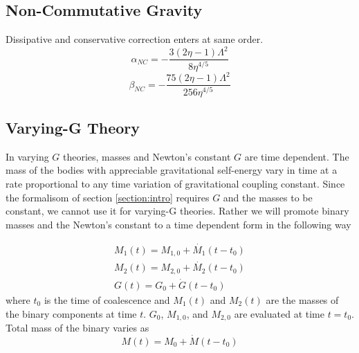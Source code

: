 \documentclass[11pt]{article}
\begin{document}
 \subsection{Non-Commutative Gravity}
 Dissipative and conservative correction enters at same order. \cite{Kobakhidze:2016cqh}
 \begin{equation}
 \alpha_{NC}=-\frac{3 (2 \eta -1) \Lambda ^2}{8 \eta ^{4/5}}
 \end{equation}
 \begin{equation}
 \beta_{NC}=-\frac{75 (2 \eta -1) \Lambda ^2}{256 \eta ^{4/5}}
 \end{equation}
 \newpage
 
 \subsection{Varying-G Theory}

 \hspace*{15.5pt} In varying $G$ theories, masses and Newton's constant $G$ are time dependent. The mass of the bodies with appreciable gravitational self-energy vary in time at a rate proportional to any time variation of gravitational coupling constant\cite{PhysRevLett.65.953}. Since the formalisom of section \ref{section:intro} requires $G$ and the masses to be constant, we cannot use it for varying-G theories. Rather we will promote binary masses and the Newton's constant to a time dependent form in the following way
 
 \begin{eqnarray}\label{eq:3.7a2}
 M_1(t)=M_{1,0}+\dot{M_1}(t-t_0)\\
 \label{eq:3.7a3}  M_2(t)=M_{2,0}+\dot{M_2}(t-t_0)\\
   \label{eq:3.7a4}  G(t)=G_0+\dot{G}(t-t_0)
 \end{eqnarray}
 where $t_0$ is the time of coalescence and $M_1(t)$ and $M_2(t)$ are the masses of the binary components at time $t$. $G_0$, $M_{1,0}$, and $M_{2,0}$ are evaluated at time $t=t_0$. Total mass of the binary varies as
 \begin{equation}
 M(t)=M_0+\dot{M}(t-t_0)
 \end{equation}
 
\end{document}
